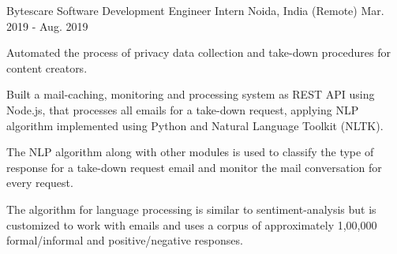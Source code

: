 \begin{cventries}
  \cventry
    {Bytescare} %
    {Software Development Engineer Intern} %
    {Noida, India (Remote)} %
    {Mar. 2019 - Aug. 2019} %
    {
      \begin{cvitems} %
        \item {Automated the process of privacy data collection and take-down procedures for content creators.}
        \item {Built a mail-caching, monitoring and processing system as REST API using Node.js, that processes all emails for a take-down request, applying NLP algorithm implemented using Python and Natural Language Toolkit (NLTK).}
        \item {The NLP algorithm along with other modules is used to classify the type of response for a take-down request email and monitor the mail conversation for every request.}
        \item {The algorithm for language processing is similar to sentiment-analysis but is customized to work with emails and uses a corpus of approximately 1,00,000 formal/informal and positive/negative responses.}
      \end{cvitems}
    }
\end{cventries}
